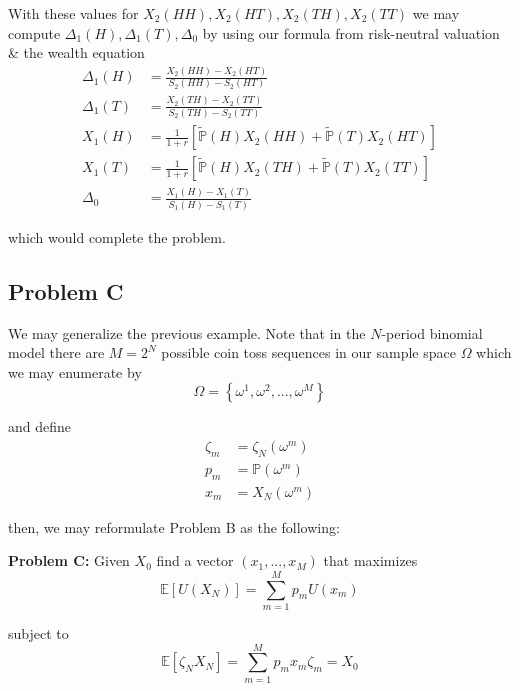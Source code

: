 \documentclass[12pt]{article}
\newlength\tindent
\renewcommand{\indent}{\hspace*{\tindent}}
\renewcommand{\P}{\mathbb P}
\newcommand{\E}{\mathbb E}
\begin{document}
\indent With these values for $X_2(HH), X_2(HT), X_2(TH), X_2(TT)$ we may compute $\Delta_1(H), \Delta_1(T), \Delta_0$ by using our formula from risk-neutral valuation \& the wealth equation
\begin{align*}
	\Delta_1(H) &= \frac{ X_2(HH) - X_2(HT) }{ S_2(HH) - S_2(HT) } \\
	\Delta_1(T) &= \frac{ X_2(TH) - X_2(TT) }{ S_2(TH) - S_2(TT) } \\
	X_1(H) &= \frac{1}{1 + r} \left[ \tilde{\P}(H)X_2(HH) + \tilde{\P}(T)X_2(HT) \right] \\
	X_1(T) &= \frac{1}{1 + r} \left[ \tilde{\P}(H)X_2(TH) + \tilde{\P}(T)X_2(TT) \right] \\
	\Delta_0 &= \frac{ X_1(H) - X_1(T) }{ S_1(H) - S_1(T) }
\end{align*}

which would complete the problem.

\subsection{Problem C}

\indent We may generalize the previous example. Note that in the $N$-period binomial model there are $M = 2^N$ possible coin toss sequences in our sample space $\Omega$ which we may enumerate by
\begin{equation*}
	\Omega = \left\{ \omega^1, \omega^2, ..., \omega^M \right\}
\end{equation*}

and define
\begin{align*}
	\zeta_m &= \zeta_N(\omega^m) \\
	p_m &= \P(\omega^m) \\
	x_m &= X_N(\omega^m)
\end{align*}

then, we may reformulate Problem B as the following:

\begin{framed}
{\bf Problem C:} Given $X_0$ find a vector $(x_1,..., x_M)$ that maximizes
\begin{equation*}
	\E[U(X_N)] = \sum^M_{m = 1} p_mU(x_m)
\end{equation*}

subject to
\begin{equation*}
	\E[\zeta_NX_N] = \sum^M_{m = 1}p_mx_m\zeta_m = X_0
\end{equation*}
\end{framed}
\end{document}
